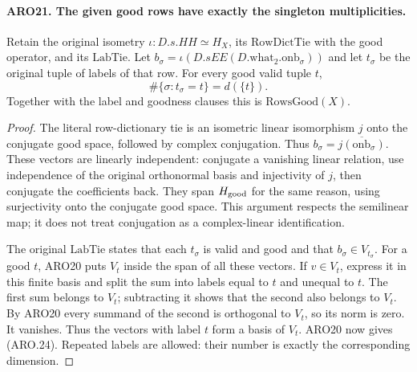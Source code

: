 \documentclass[11pt,a4paper]{article}
\numberwithin{equation}{section}
\theoremstyle{remark}\newtheorem{remark}[theorem]{Remark}
\begin{document}
\paragraph{ARO21. The given good rows have exactly the singleton multiplicities.}
\label{claim:ARO21}
Retain the original isometry
\(\iota:D.s.HH\simeq H_X\), its \(\mathrm{RowDictTie}\) with
the good operator, and its \(\mathrm{LabTie}\).  Let
\(b_\sigma=\iota(D.sEE(D.\mathrm{what}_2.\mathrm{onb}_\sigma))\)
and let \(t_\sigma\) be the original tuple of labels of that row.
For every good valid tuple \(t\),
\[
                   \#\{\sigma:t_\sigma=t\}=d(\{t\}).
 \tag{ARO.24}
\]
Together with the label and goodness clauses this is
\(\mathrm{RowsGood}(X)\).
\begin{proof}
The literal row-dictionary tie is an isometric linear isomorphism
\(j\) onto the conjugate good space, followed by complex
conjugation.  Thus \(b_\sigma=\overline{j(\mathrm{onb}_\sigma)}\).
These vectors are linearly independent: conjugate a vanishing
linear relation, use independence of the original orthonormal
basis and injectivity of \(j\), then conjugate the coefficients
back.  They span \(H_{\rm good}\) for the same reason, using
surjectivity onto the conjugate good space.  This argument respects
the semilinear map; it does not treat conjugation as a complex-linear
identification.

The original \(\mathrm{LabTie}\) states that each \(t_\sigma\)
is valid and good and that \(b_\sigma\in V_{t_\sigma}\).
For a good \(t\), ARO20 puts \(V_t\) inside the span of all these
vectors.  If \(v\in V_t\), express it in this finite basis and
split the sum into labels equal to \(t\) and unequal to \(t\).
The first sum belongs to \(V_t\); subtracting it shows that the
second also belongs to \(V_t\).  By ARO20 every summand of the
second is orthogonal to \(V_t\), so its norm is zero.  It vanishes.
Thus the vectors with label \(t\) form a basis of \(V_t\).
ARO20 now gives (ARO.24).  Repeated labels are allowed: their
number is exactly the corresponding dimension.
\end{proof}

\end{document}
